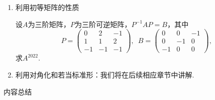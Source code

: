 \begin{enumerate}
    \begin{proof}
        
    \end{proof}

    \begin{example}
        已知数列$\{a_n\},\enspace\{b_n\}$满足$a_0=-1,\enspace b_0=3$，且
        \[\begin{cases}
            a_n=3a_{n-1}+b_{n-1}+2^{n-1} \\ b_n=2a_{n-1}+4b_{n-1}+2^n
        \end{cases}\]
        求$\{a_n\}\enspace\{b_n\}$的通项公式.
    \end{example}
    \begin{solution}

    \end{solution}

    \item 利用初等矩阵的性质
    \begin{example}
        设$A$为三阶矩阵，$P$为三阶可逆矩阵，$P^{-1}AP=B$，其中
        \[P=\begin{pmatrix}
            0 & 2 & -1 \\ 1 & 1 & 2 \\ -1 & -1 & -1
        \end{pmatrix},\enspace B=\begin{pmatrix}
            0 & 0 & -1 \\ 0 & -1 & 0 \\ -1 & 0 & 0
        \end{pmatrix},\]
        求$A^{2022}$.
    \end{example}
    \begin{solution}

    \end{solution}

    \item 利用对角化和若当标准形：我们将在后续相应章节中讲解.
\end{enumerate}

\vspace{2ex}
\centerline{\heiti \Large 内容总结}

\vspace{2ex}

